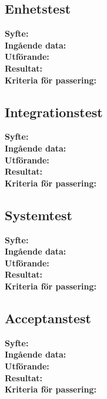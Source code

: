 \documentclass[a4paper,10pt]{article}
\begin{document}
\subsection{Enhetstest}
   \textbf{Syfte:}
    \\ \textbf{Ingående data:}
    \\ \textbf{Utförande:}
    \\ \textbf{Resultat:}
    \\ \textbf{Kriteria för passering:}
\subsection{Integrationstest}
   \textbf{Syfte:}
    \\ \textbf{Ingående data:}
    \\ \textbf{Utförande:}
    \\ \textbf{Resultat:}
    \\ \textbf{Kriteria för passering:}
\subsection{Systemtest}
   \textbf{Syfte:}
    \\ \textbf{Ingående data:}
    \\ \textbf{Utförande:}
    \\ \textbf{Resultat:}
    \\ \textbf{Kriteria för passering:}
\subsection{Acceptanstest}
   \textbf{Syfte:}
    \\ \textbf{Ingående data:}
    \\ \textbf{Utförande:}
    \\ \textbf{Resultat:}
    \\ \textbf{Kriteria för passering:}
\end{document}
